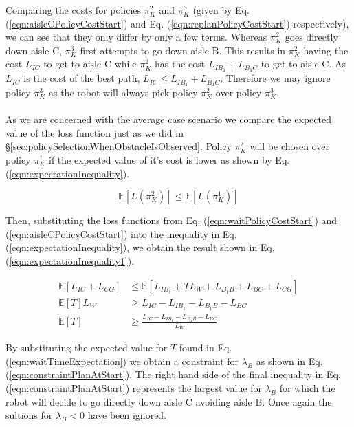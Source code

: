 \documentclass[a4paper,12pt]{article}
\begin{document}
			Comparing the costs for policies $\pi_{K}^{2}$ and $\pi_{K}^{3}$ (given by Eq. (\ref{eqn:aisleCPolicyCostStart}) and Eq. (\ref{eqn:replanPolicyCostStart}) respectively), we can see that they only differ by only a few terms. Whereas $\pi_{K}^{2}$ goes directly down aisle C, $\pi_{K}^{3}$ first attempts to go down aisle B. This results in $\pi_{K}^{2}$ having the cost $L_{IC}$ to get to aisle C while $\pi_{K}^{2}$ has the cost $L_{IB_1}+L_{B_1C}$ to get to aisle C. As $L_{IC}$ is the cost of the best path, $L_{IC} \leq L_{IB_1}+L_{B_1C}$. Therefore we may ignore policy $\pi_{K}^{3}$ as the robot will always pick policy $\pi_{K}^{2}$ over policy $\pi_{K}^{3}$.
			\\
			\\
			As we are concerned with the average case scenario we compare the expected value of the loss function just as we did in \S \ref{sec:policySelectionWhenObstacleIsObserved}. Policy $\pi_{K}^{2}$ will be chosen over policy $\pi_{K}^{1}$ if the expected value of it's cost is lower as shown by Eq. (\ref{eqn:expectationInequality}).
			
			\begin{equation}
			\mathbb{E}\left[L\left(\pi_{K}^{2}\right)\right] \leq \mathbb{E}\left[L\left(\pi_{K}^{1}\right)\right]
			\label{eqn:expectationInequality}
			\end{equation}
			
			Then, substituting the loss functions from Eq. (\ref{eqn:waitPolicyCostStart}) and (\ref{eqn:aisleCPolicyCostStart}) into the inequality in Eq. (\ref{eqn:expectationInequality}), we obtain the result shown in Eq. (\ref{eqn:expectationInequality1}).
			
			\begin{equation}
			\begin{split}
			\mathbb{E}[L_{IC}+L_{CG}] &\leq \mathbb{E}[L_{IB_1}+TL_W + L_{B_1B}+L_{BC}+L_{CG}] \\
			\mathbb{E}[T]L_W &\geq L_{IC}-L_{IB_1}-L_{B_1B}-L_{BC}\\
			\mathbb{E}[T] &\geq \frac{L_{IC}-L_{IB_1}-L_{B_1B}-L_{BC}}{L_W}
			\end{split}
			\label{eqn:expectationInequality1}
			\end{equation}
			
			By substituting the expected value for $T$ found in Eq. (\ref{eqn:waitTimeExpectation}) we obtain a constraint for $\lambda_B$ as shown in Eq. (\ref{eqn:constraintPlanAtStart}). The right hand side of the final inequality in Eq. (\ref{eqn:constraintPlanAtStart}) represents the largest value for $\lambda_B$ for which the robot will decide to go directly down aisle C avoiding aisle B. Once again the sultions for $\lambda_B < 0$ have been ignored. 
			
\end{document}
